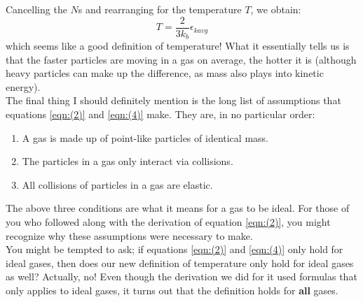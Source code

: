 Cancelling the $N$s and rearranging for the temperature $T$, we obtain:
\begin{equation}
    \label{eqn:(8)}
    T = \frac{2}{3k_b}\epsilon_{kavg}
\end{equation}
which seems like a good definition of temperature! What it essentially tells us is that the faster particles are moving in a gas on average, the hotter it is (although heavy particles can make up the difference, as mass also plays into kinetic energy).\\
\noindent
The final thing I should definitely mention is the long list of assumptions that equations \ref{eqn:(2)} and \ref{eqn:(4)} make. They are, in no particular order:
\begin{enumerate}
    \item A gas is made up of point-like particles of identical mass.
    \item The particles in a gas only interact via collisions.
    \item All collisions of particles in a gas are elastic.
\end{enumerate}
The above three conditions are what it means for a gas to be ideal. For those of you who followed along with the derivation of equation \ref{eqn:(2)}, you might recognize why these assumptions were necessary to make. \\
You might be tempted to ask; if equations \ref{eqn:(2)} and \ref{eqn:(4)} only hold for ideal gases, then does our new definition of temperature only hold for ideal gases as well? Actually, no! Even though the derivation we did for it used formulas that only applies to ideal gases, it turns out that the definition holds for \textbf{all} gases.